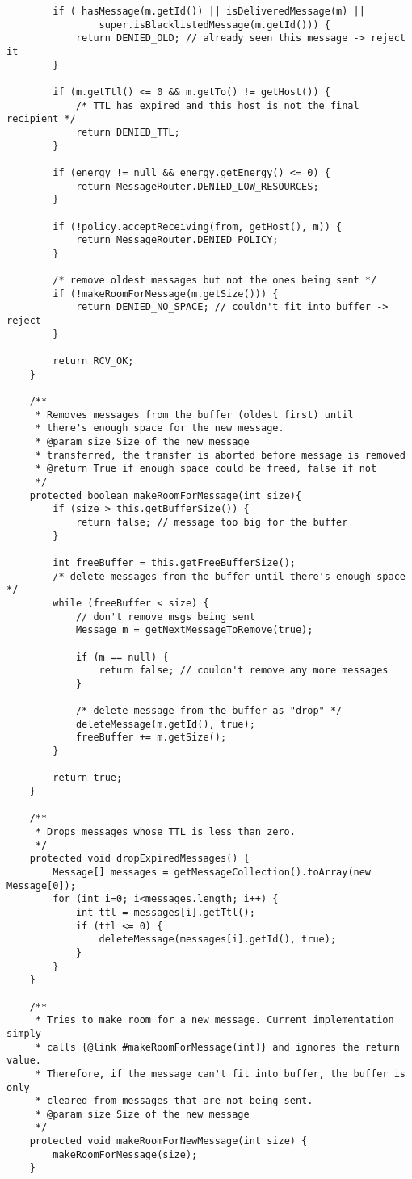 \documentclass[11pt]{icsthesis}
\begin{document}
\begin{framed}
\begin{verbatim}
		if ( hasMessage(m.getId()) || isDeliveredMessage(m) ||
				super.isBlacklistedMessage(m.getId())) {
			return DENIED_OLD; // already seen this message -> reject it
		}
		
		if (m.getTtl() <= 0 && m.getTo() != getHost()) {
			/* TTL has expired and this host is not the final recipient */
			return DENIED_TTL; 
		}

		if (energy != null && energy.getEnergy() <= 0) {
			return MessageRouter.DENIED_LOW_RESOURCES;
		}
		
		if (!policy.acceptReceiving(from, getHost(), m)) {
			return MessageRouter.DENIED_POLICY;
		}
		
		/* remove oldest messages but not the ones being sent */
		if (!makeRoomForMessage(m.getSize())) {
			return DENIED_NO_SPACE; // couldn't fit into buffer -> reject
		}
		
		return RCV_OK;
	}
	
	/** 
	 * Removes messages from the buffer (oldest first) until
	 * there's enough space for the new message.
	 * @param size Size of the new message 
	 * transferred, the transfer is aborted before message is removed
	 * @return True if enough space could be freed, false if not
	 */
	protected boolean makeRoomForMessage(int size){
		if (size > this.getBufferSize()) {
			return false; // message too big for the buffer
		}
			
		int freeBuffer = this.getFreeBufferSize();
		/* delete messages from the buffer until there's enough space */
		while (freeBuffer < size) {
            // don't remove msgs being sent
			Message m = getNextMessageToRemove(true);

			if (m == null) {
				return false; // couldn't remove any more messages
			}			
			
			/* delete message from the buffer as "drop" */
			deleteMessage(m.getId(), true);
			freeBuffer += m.getSize();
		}
		
		return true;
	}
	
	/**
	 * Drops messages whose TTL is less than zero.
	 */
	protected void dropExpiredMessages() {
		Message[] messages = getMessageCollection().toArray(new Message[0]);
		for (int i=0; i<messages.length; i++) {
			int ttl = messages[i].getTtl(); 
			if (ttl <= 0) {
				deleteMessage(messages[i].getId(), true);
			}
		}
	}
	
	/**
	 * Tries to make room for a new message. Current implementation simply
	 * calls {@link #makeRoomForMessage(int)} and ignores the return value.
	 * Therefore, if the message can't fit into buffer, the buffer is only 
	 * cleared from messages that are not being sent.
	 * @param size Size of the new message
	 */
	protected void makeRoomForNewMessage(int size) {
		makeRoomForMessage(size);
	}


\end{verbatim}
\end{framed}
\end{document}
